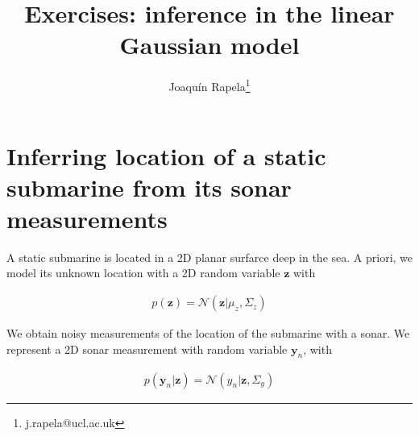 \documentclass[12pt]{article}
\begin{document}
\title{Exercises: inference in the linear Gaussian model}
\author{Joaqu\'{i}n Rapela\thanks{j.rapela@ucl.ac.uk}}

\maketitle

\section{Inferring location of a static submarine from its sonar
measurements}

A static submarine is located in a 2D planar surfarce deep in the sea. A
priori, we model its unknown location with a 2D random variable
$\mathbf{z}$ with 

\begin{align}
    p(\mathbf{z})=\mathcal{N}\left(\mathbf{z}|\mu_z,\Sigma_z\right)
\end{align}

We obtain noisy measurements of the location of the submarine with a sonar.
We represent a 2D sonar measurement with random variable $\mathbf{y}_n$,
with 

\begin{align}
    p(\mathbf{y}_n|\mathbf{z})=\mathcal{N}(y_n|\mathbf{z}, \Sigma_y)
\end{align}
\end{document}
